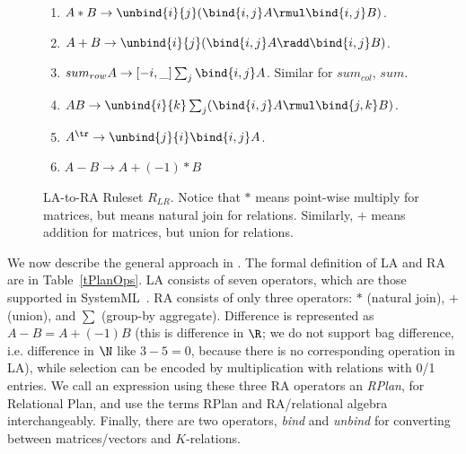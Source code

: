 \begin{figure}
\centering
\begin{minipage}{0.6\textwidth}
\begin{enumerate}
  \item $A*B \rightarrow \unbind{i}{j}(\bind{i,j}A \rmul \bind{i,j}B)$.
  \item $A+B \rightarrow \unbind{i}{j}(\bind{i,j}A \radd \bind{i,j}B)$.
  \item $sum_{row} A \rightarrow [-i,\_ ] \sum_j \bind{i,j} A$. Similar for
    $sum_{col}$, $sum$.
  \item $AB \rightarrow \unbind{i}{k} \sum_j (\bind{i,j}A \rmul \bind{j,k}B)$.
  \item $A^\tr \rightarrow \unbind{j}{i} \bind{i,j}A$.
  \item $A - B \rightarrow A + (-1) * B$
\end{enumerate}
\end{minipage}{}
\caption{LA-to-RA Ruleset $R_{LR}$. Notice that $*$ means point-wise multiply for matrices,
  but means natural join for relations. Similarly, $+$ means addition for matrices, but
  union for relations.}
\label{RMR}
\end{figure}


We now describe the general approach in \sys.  The formal definition
of LA and RA are in Table~\ref{tPlanOps}.  LA consists of seven
operators, which are those supported in
SystemML~\cite{DBLP:reference/bdt/Boehm19}.  RA consists of only three
operators: $*$ (natural join), $+$ (union), and $\sum$ (group-by
aggregate).  Difference is represented as $A-B = A + (-1)B$ (this is
difference in $\R$; we do not support bag difference, i.e.  difference
in $\N$ like $3-5=0$, because there is no corresponding operation in
LA), while selection can be encoded by multiplication with relations
with 0/1 entries.  We call an expression using these three RA
operators an {\em RPlan}, for Relational Plan, and use the terms RPlan
and RA/relational algebra interchangeably.  Finally, there are two
operators, {\em bind} and {\em unbind} for converting between
matrices/vectors and $K$-relations.



